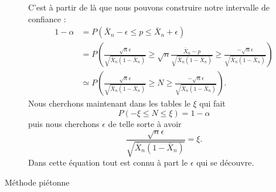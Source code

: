 \begin{description}
		C'est à partir de là que nous pouvons construire notre intervalle de confiance :
		\begin{subequations}
			\begin{align}
				1-\alpha & =P(\bar X_n-\epsilon\leq p\leq \bar X_n+\epsilon)                                                                                                                                                             \\
				         & =P\left( \frac{ \sqrt{n}\epsilon }{ \sqrt{\bar X_n(1-\bar X_n)} }\geq   \sqrt{n}\frac{ \bar X_n-p }{ \sqrt{\bar X_n(1-\bar X_n)} }   \geq   \frac{ -\sqrt{n}\epsilon }{ \sqrt{\bar X_n(1-\bar X_n)} } \right) \\
				         & \simeq P\left( \frac{ \sqrt{n}\epsilon }{ \sqrt{\bar X_n(1-\bar X_n)} }\geq N\geq   \frac{ -\sqrt{n}\epsilon }{ \sqrt{\bar X_n(1-\bar X_n)} } \right).
			\end{align}
		\end{subequations}
		Nous cherchons maintenant dans les tables le \( \xi\) qui fait
		\begin{equation}
			P(-\xi\leq N\leq \xi)=1-\alpha
		\end{equation}
		puis nous cherchons \( \epsilon\) de telle sorte à avoir
		\begin{equation}
			\frac{ \sqrt{n}\epsilon }{ \sqrt{\bar X_n(1-\bar X_n)} }=\xi.
		\end{equation}
		Dans cette équation tout est connu à part le \( \epsilon\) qui se découvre.

	\item[Méthode piétonne]


\end{description}
